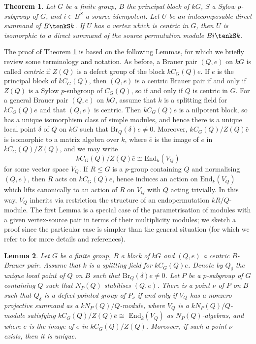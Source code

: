 \documentclass{amsart}
\theoremstyle{plain}\newtheorem{Theorem}{Theorem}[section]
\theoremstyle{plain}\newtheorem{Conjecture}[Theorem]{Conjecture}
\theoremstyle{plain}\newtheorem{Corollary}[Theorem]{Corollary}
\theoremstyle{plain}\newtheorem{Lemma}[Theorem]{Lemma}
\theoremstyle{plain}\newtheorem{Proposition}[Theorem]{Proposition}
\theoremstyle{definition}\newtheorem{Definition}[Theorem]{Definition}
\theoremstyle{definition}\newtheorem{Example}[Theorem]{Example}
\theoremstyle{definition}\newtheorem{Examples}[Theorem]{Examples}
\theoremstyle{definition}\newtheorem{Exercise}[Theorem]{Exercise}
\theoremstyle{definition}\newtheorem{Notation}[Theorem]{Notation}
\theoremstyle{definition}\newtheorem{Remark}[Theorem]{Remark}
\theoremstyle{definition}\newtheorem{Remarks}[Theorem]{Remarks}
\theoremstyle{plain}\newtheorem{Statement}[Theorem]{}
\def\Br{\mathrm{Br}}                 \def\ten{\otimes}
\def\End{\mathrm{End}}
\begin{document}
\begin{Theorem} \label{Bi-princ-block}
Let $G$ be a finite group, $B$ the principal block of $kG$, $S$ a Sylow $p$-subgroup
of $G$, and $i\in B^S$ a source idempotent. Let $U$ be an indecomposable
direct summand of $B\tenkS k$. If $U$ has a vertex  which is centric in $G$,
then $U$ is isomorphic to a direct summand of the source permutation module
$Bi\tenkS k$.
\end{Theorem}

The proof of Theorem \ref{Bi-princ-block} 
is based on the following Lemmas, for which we briefly review
some terminology and notation.  As before, a  Brauer pair $(Q,e)$ on $kG$
is called {\em centric} if $Z(Q)$ is a defect group of the block $kC_G(Q)e$.
If $e$ is the principal block of $kC_G(Q)$, then $(Q,e)$ is a centric
Brauer pair if and only if   $Z(Q)$ is a Sylow $p$-subgroup of $C_G(Q)$, so if and
only if $Q$ is centric in $G$. For a general Brauer pair $(Q,e)$ on $kG$, assume
that $k$ is a splitting field for $kC_G(Q)e$ and that $(Q,e)$ is centric. 
Then $kC_G(Q)e$ is a nilpotent block, so  has a unique isomorphism class of simple 
modules, and hence there is a unique local point $\delta$ of $Q$ on $kG$ such that
$\Br_Q(\delta)e\neq 0$. Moreover, $kC_G(Q)/Z(Q)\bar e$ is isomorphic to a 
matrix algebra over $k$, where
$\bar e$ is the image of $e$ in $kC_G(Q)/Z(Q)$, and we may write
$$k C_G(Q)/Z(Q)\bar e\cong\End_k(V_Q)$$ 
for some vector space $V_Q$.
If $R \leq G $ is a $p$-group containing $Q$ and  normalising $(Q, e) $, then 
$R$ acts on $kC_G(Q)e$, hence induces an action on $\End_k(V_Q)$ 
which lifts canonically to an action of $R$ on $V_Q$  with $Q$  acting trivially. 
In this way,  $V_Q$  inherits  via restriction  the structure of   an endopermutation 
$kR/Q$-module.
The first Lemma is a special case of the parametrisation of modules
with a given vertex-source pair in terms of their multiplicity modules;
we sketch a proof since the particular case is simpler than the general situation
(for which we refer to \cite[Section 5.7]{LiBookI} for more details and references).

\begin{Lemma} \label{non-local-points-1}
Let $G$ be a finite group, $B$ a block of $kG$ and $(Q,e)$ a centric $B$-Brauer 
pair. Assume that $k$ is a splitting field for $kC_G(Q)e$. Denote by $Q_\delta$ 
the unique local point of $Q$ on $B$ such that $\Br_Q(\delta)e\neq 0$.
Let $P$ be a $p$-subgroup of $G$ containing $Q$ such that $N_P(Q)$
stabilises $(Q,e)$. There is a point $\nu$ of 
$P$ on $B$ such that $Q_\delta$ is a defect pointed group of $P_\nu$ 
if and only  if $V_Q$ has a nonzero projective summand as a $kN_P(Q)/Q$-module,
where $V_Q$ is a $kN_P(Q)/Q$-module satisfying $kC_G(Q)/Z(Q)\bar e\cong$ 
$\End_k(V_Q)$ as $N_P(Q)$-algebras, and where $\bar e$ is the image of $e$
in $kC_G(Q)/Z(Q)$.  Moreover, if such a point $\nu$ exists, then it is unique. 
\end{Lemma}
\end{document}
